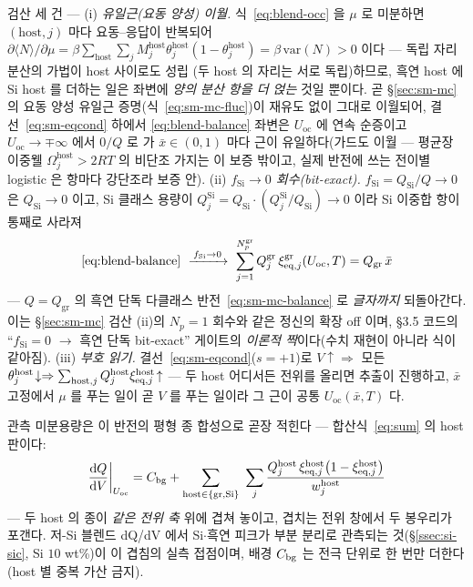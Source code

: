\begin{verifybox}
검산 세 건 --- (i) \emph{유일근(요동 양성) 이월.} 식~\eqref{eq:blend-occ} 을 $\mu$ 로 미분하면
$(\mathrm{host},j)$ 마다 요동--응답이 반복되어
$\partial\langle N\rangle/\partial\mu=\beta\sum_\mathrm{host}\sum_jM_j^\mathrm{host}\theta_j^\mathrm{host}
(1-\theta_j^\mathrm{host})=\beta\,\mathrm{var}(N)>0$ 이다 --- 독립 자리 분산의 가법이 host 사이로도 성립
(두 host 의 자리는 서로 독립)하므로, 흑연 host 에 Si host 를 더하는 일은 좌변에 \emph{양의 분산 항을 더
얹는} 것일 뿐이다. 곧 \S\ref{sec:sm-mc} 의 요동 양성 유일근 증명(식~\eqref{eq:sm-mc-fluc})이 재유도
없이 그대로 이월되어, 결선~\eqref{eq:sm-eqcond} 하에서 \eqref{eq:blend-balance} 좌변은 $U_\mathrm{oc}$
에 연속 순증이고 $U_\mathrm{oc}\to\mp\infty$ 에서 $0/Q$ 로 가 $\bar x\in(0,1)$ 마다 근이 유일하다(가드도
이월 --- 평균장 이중웰 $\Omega_j^\mathrm{host}>2RT$ 의 비단조 가지는 이 보증 밖이고, 실제 반전에 쓰는
전이별 logistic 은 항마다 강단조라 보증 안). (ii) \emph{$f_\mathrm{Si}\to0$ 회수(bit-exact).}
$f_\mathrm{Si}=Q_\mathrm{Si}/Q\to0$ 은 $Q_\mathrm{Si}\to0$ 이고, Si 클래스 용량이
$Q_j^\mathrm{Si}=Q_\mathrm{Si}\cdot(Q_j^\mathrm{Si}/Q_\mathrm{Si})\to0$ 이라 Si 이중합 항이 통째로 사라져
\begin{equation}
\eqref{eq:blend-balance}\ \xrightarrow{\,f_\mathrm{Si}\to0\,}\
\sum_{j=1}^{N_p^\mathrm{gr}}Q_j^\mathrm{gr}\,\xi_{\eq,j}^\mathrm{gr}(U_\mathrm{oc},T)=Q_\mathrm{gr}\,\bar x
\label{eq:blend-limit}
\end{equation}
--- $Q=Q_\mathrm{gr}$ 의 흑연 단독 다클래스 반전~\eqref{eq:sm-mc-balance} 로 \emph{글자까지} 되돌아간다.
이는 \S\ref{sec:sm-mc} 검산 (ii)의 $N_p{=}1$ 회수와 같은 정신의 확장 off 이며, §3.5 코드의
``$f_\mathrm{Si}{=}0$ $\to$ 흑연 단독 bit-exact'' 게이트의 \emph{이론적 짝}이다(수치 재현이 아니라 식이
같아짐). (iii) \emph{부호 읽기.} 결선~\eqref{eq:sm-eqcond}($s{=}+1$)로 $V\!\uparrow\Rightarrow$ 모든
$\theta_j^\mathrm{host}\!\downarrow\Rightarrow\sum_{\mathrm{host},j}Q_j^\mathrm{host}
\xi_{\mathrm{eq},j}^\mathrm{host}\!\uparrow$ --- 두 host 어디서든 전위를 올리면 추출이 진행하고, $\bar x$ 고정에서
$\mu$ 를 푸는 일이 곧 $V$ 를 푸는 일이라 그 근이 공통 $U_\mathrm{oc}(\bar x,T)$ 다.
\end{verifybox}

관측 미분용량은 이 반전의 평형 종 합성으로 곧장 적힌다 --- 합산식~\eqref{eq:sum} 의 host 판이다:
\begin{equation}
\frac{\dd Q}{\dd V}\bigg|_{U_\mathrm{oc}}=C_\bg+\sum_{\mathrm{host}\in\{\mathrm{gr},\mathrm{Si}\}}\ \sum_{j}
\frac{Q_j^{\mathrm{host}}\,\xi_{\eq,j}^{\mathrm{host}}\bigl(1-\xi_{\eq,j}^{\mathrm{host}}\bigr)}{w_j^{\mathrm{host}}}
\label{eq:blend-dqdv}
\end{equation}
--- 두 host 의 종이 \emph{같은 전위 축} 위에 겹쳐 놓이고, 겹치는 전위 창에서 두 봉우리가 포갠다. 저-Si
블렌드 dQ/dV 에서 Si$\cdot$흑연 피크가 부분 분리로 관측되는 것(\S\ref{ssec:si-sic}, Si $10$
wt\%\cite{naboka_sic2021})이 이 겹침의 실측 접점이며, 배경 $C_{\mathrm{bg}}$ 는 전극 단위로 한 번만 더한다(host 별
중복 가산 금지).

